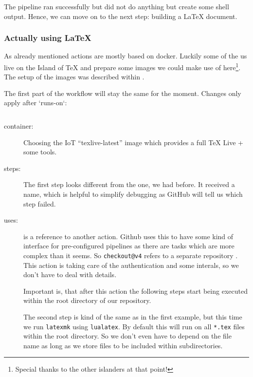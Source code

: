 \documentclass[final]{ltugboat}
\newcommand*{\action}[1]{\texttt{#1}}
\newcommand*{\command}[1]{\texttt{#1}}
\newcommand*{\file}[1]{\texttt{#1}}
\newcommand*{\containerimage}[1]{\enquote{#1}}
\begin{document}
The pipeline ran successfully but did not do anything but create some shell output.
Hence, we can move on to the next step: building a \LaTeX{} document.

\subsubsection{Actually using \LaTeX}

As already mentioned actions are mostly based on docker.
Luckily some of the us live on the Island of TeX and prepare some images we could make use of here\footnote{Special thanks to the other islanders at that point!}.
The setup of the images was described within \cite{islandoftex-docker-gitlab}.

The first part of the workflow will stay the same for the moment.
Changes only apply after `runs-on`:

\inputminted[firstline=5, lastline=12,gobble=3]{yaml}{examples/latex-basic.yml}


\begin{description}
\item[container:] Choosing the IoT \containerimage{texlive-latest} image which provides a full TeX Live + some tools\cite{islandoftex-docker}.
\item[steps:]
The first step looks different from the one, we had before.
It received a name, which is helpful to simplify debugging as GitHub will tell us which step failed.

\item[uses:] is a reference to another action.
Github uses this to have some kind of interface for pre-configured pipelines as there are tasks which are more complex than it seems.
So \action{checkout@v4} refers to a separate repository \cite{github-action-checkout}.
This action is taking care of the authentication and some interals, so we don't have to deal with details.

Important is, that after this action the following steps start being executed within the root directory of our repository.

The second step is kind of the same as in the first example, but this time we run \command{latexmk}\cite{latexmk} using \command{lualatex}.
By default this will run on all \file{*.tex} files within the root directory.
So we don't even have to depend on the file name as long as we store files to be included within subdirectories.
\end{description}
\end{document}
